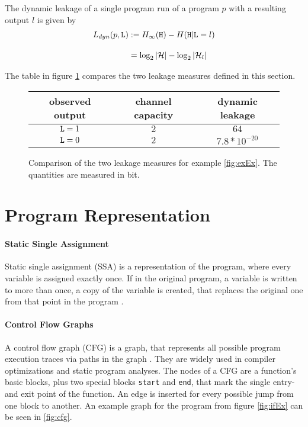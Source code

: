 \begin{theorem}
    The dynamic leakage of a single program run of a program $p$ with a resulting output $l$ is given by 
    \begin{align*}
        L_{dyn}(p, \mathtt{L}) &:= H_\infty(\mathtt{H}) - H(\mathtt{H} | \mathtt{L} = l) \\[1em]
        &= \log_2 |\mathcal{H}| - \log_2 |\mathcal{H}_l|
    \end{align*}
\end{theorem}

The table in figure \ref{tab:comp} compares the two leakage measures defined in this section. 

\begin{figure}
    \centering
    \begin{tabular}{ |c|c|c| } 
        \hline
        observed output & channel capacity & dynamic leakage \\
        \hline
        $\mathtt{L} = 1$ & $2$ & $64$ \\ 
        $\mathtt{L} = 0$ & $2$ & $7.8 * 10^{-20}$ \\ 
        \hline
    \end{tabular}
    \caption{Comparison of the two leakage measures for example \ref{fig:exEx}. The quantities are measured in bit.}
    \label{tab:comp}
\end{figure}



\section{Program Representation}

\paragraph{Static Single Assignment}
Static single assignment (SSA) is a representation of the program, where every variable is assigned exactly once. If in the original program, a variable is written to more than once, a copy of the variable is created, that replaces the original one from that point in the program \cite{rosen88}.

\paragraph{Control Flow Graphs}
A control flow graph (CFG) is a graph, that represents all possible program execution traces via paths in the graph \cite{allen70}. They are widely used in compiler optimizations and static program analyses. The nodes of a CFG are a function's basic blocks, plus two special blocks \texttt{start} and \texttt{end}, that mark the single entry- and exit point of the function. An edge is inserted for every possible jump from one block to another. An example graph for the program from figure \ref{fig:ifEx} can be seen in \ref{fig:cfg}.


